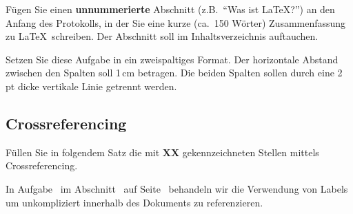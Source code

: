 \begin{aufgabe}
F\"ugen Sie einen \textbf{unnummerierte} Abschnitt (z.B.\ ``Was ist
\LaTeX?'') an den Anfang des Protokolls, in der Sie eine kurze (ca.\ 150
W\"orter) Zusammenfassung zu \LaTeX\ schreiben. Der Abschnitt soll im
Inhaltsverzeichnis auftauchen.
\end{aufgabe}

\begin{multicols}{2}
\begin{aufgabe}
Setzen Sie diese Aufgabe in ein zweispaltiges Format. Der horizontale Abstand zwischen den Spalten soll 1\,cm betragen. Die beiden Spalten sollen durch eine 2\,pt dicke vertikale Linie getrennt werden. 		
\end{aufgabe}
\end{multicols}


\subsection{Crossreferencing}							%
\label{subs:Crossreferencing}
\begin{aufgabe}
\label{aufg:9}
F\"ullen Sie in folgendem Satz die mit \textbf{XX} gekennzeichneten Stellen
mittels Crossreferencing.
\end{aufgabe}
In Aufgabe~ im Abschnitt~ auf Seite~\textbf{\pageref{subs:Crossreferencing}}
behandeln wir die Verwendung von Labels um unkompliziert innerhalb des
Dokuments zu referenzieren.
